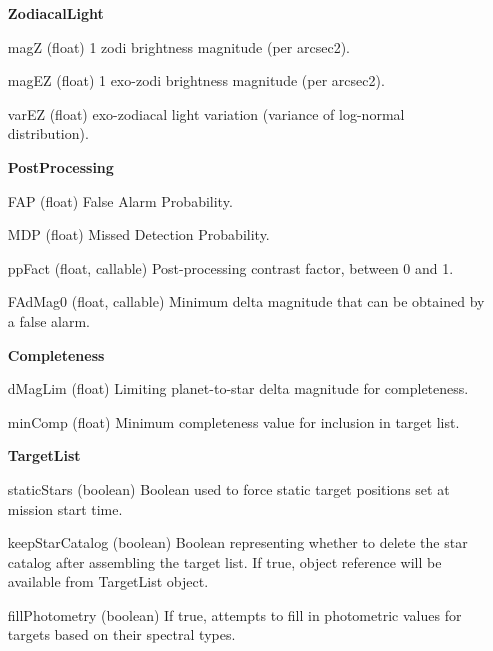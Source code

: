 \documentclass[cleanfoot]{asme2ej}
\begin{document}
\begin{itemize}[leftmargin=1.5in,font={\ttfamily}]
\item[\textbf{ZodiacalLight}]
\item[magZ] (float) 1 zodi brightness magnitude (per arcsec2).
\item[magEZ] (float) 1 exo-zodi brightness magnitude (per arcsec2).
\item[varEZ] (float) exo-zodiacal light variation (variance of log-normal distribution).

\item[\textbf{PostProcessing}]
\item[FAP] (float) False Alarm Probability.
\item[MDP] (float) Missed Detection Probability.
\item[ppFact] (float, callable) Post-processing contrast factor, between 0 and 1.
\item[FAdMag0] (float, callable) Minimum delta magnitude that can be obtained by a false alarm.

\item[\textbf{Completeness}]
\item[dMagLim] (float) Limiting planet-to-star delta magnitude for completeness.
\item[minComp] (float) Minimum completeness value for inclusion in target list.

\item[\textbf{TargetList}]
\item[staticStars] (boolean) Boolean used to force static target positions set at mission start time.
\item[keepStarCatalog] (boolean) Boolean representing whether to delete the star catalog after assembling the target list.  If true, object reference will be available from TargetList object.
\item[fillPhotometry] (boolean) If true, attempts to fill in photometric values for targets based on their spectral types.


\end{itemize}
\end{document}
